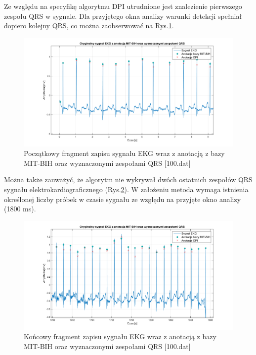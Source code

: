 \documentclass[a4paper,10pt]{article} %
\begin{document}
Ze względu na specyfikę algorytmu DPI utrudnione jest znalezienie pierwszego zespołu QRS w sygnale. Dla przyjętego okna analizy warunki detekcji spełniał dopiero kolejny QRS, co można zaobserwować na Rys.\ref{beginning}. 
\begin{figure}[h]
    \centering
    \includegraphics[width=1\textwidth]{img/100_beginning.png}
    \caption{Początkowy fragment zapisu sygnału EKG wraz z anotacją z bazy MIT-BIH oraz wyznaczonymi zespołami QRS [100.dat]}
    \label{beginning}
\end{figure}
\FloatBarrier
Można także zauważyć, że algorytm nie wykrywał dwóch ostatnich zespołów QRS sygnału elektrokardiograficznego (Rys.\ref{ending}). W założeniu metoda wymaga istnienia określonej liczby próbek w czasie sygnału ze względu na przyjęte okno analizy (1800 ms).
\begin{figure}[h]
    \centering
    \includegraphics[width=1\textwidth]{img/100_ending.png}
    \caption{Końcowy fragment zapisu sygnału EKG wraz z anotacją z bazy MIT-BIH oraz wyznaczonymi zespołami QRS [100.dat]}
    \label{ending}
\end{figure}
\FloatBarrier
\end{document}
